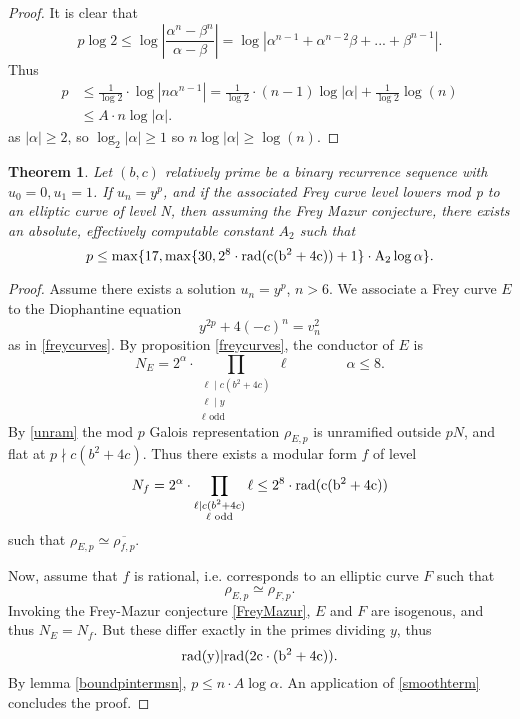 \documentclass[12pt]{amsart}
\newtheorem{thm}{Theorem}[section]
\theoremstyle{definition}
\newcommand{\rad}{\rm rad}
\renewcommand{\bar}{\overline}
\newcommand{\notdiv}{\nmid}
\newcommand{\bfrac}[2]{\left| \frac{#1}{#2} \right|}
\begin{document}
\begin{proof}
It is clear that
\[p\log{2} \leq \log \bfrac{\alpha^n - \beta^n}{\alpha-\beta}  = \log|\alpha^{n-1}+ \alpha^{n-2}\beta+...+\beta^{n-1}|. \]
Thus
\begin{align*}
p & \leq  \frac{1}{\log{2}} \cdot \log|n\alpha^{n-1}| = \frac{1}{\log{2}} \cdot (n-1)\log|\alpha| + \frac{1}{\log{2}} \log(n)  \\
& \leq A\cdot n \log|\alpha|.
\end{align*}
as $|\alpha| \geq 2$, so $\log_2|\alpha| \geq 1$ so $n\log|\alpha| \geq  \log(n)$.
\end{proof}

\begin{thm}\label{ell_bound_final}
Let $(b,c)$ relatively prime be a binary recurrence sequence with $u_0=0,u_1=1$. If $u_n = y^p$, and if the associated Frey curve level lowers mod p to an elliptic curve of level N, then assuming the Frey Mazur conjecture, there exists an absolute, effectively computable constant $A_2$ such that
\[ p \leq \max\{17, \max\{30, 2^8 \cdot \rad(c(b^2+4c))+1\} \cdot A_2\log{\alpha} \}. \]
\end{thm}

\begin{proof}
Assume there exists a solution $u_n = y^p$, $n > 6$.
We associate a Frey curve $E$ to the Diophantine equation
\[ y^{2p} +4(-c)^n = v_n^2 \]
as in \ref{freycurves}.  By proposition \ref{freycurves}, the conductor of $E$ is
\[ N_E = 2^{\alpha}  \cdot \prod_{\substack{ \ell \mid c(b^2+4c) \\ \ell \mid y \\ \ell \text{ odd}}} \ell \qquad \qquad \alpha \leq 8. \]
By \ref{unram} the mod $p$ Galois representation $\rho_{E,p}$ is unramified outside $pN$, and flat at $p \notdiv c(b^2+4c)$.  Thus there exists a modular form $f$ of level 
\[N_f = 2^{\alpha} \cdot \prod_{\substack{ \ell \mid c(b^2+4c) \\ \ell \text{ odd}}} \ell \leq 2^8 \cdot \rad(c(b^2+4c))  \]
such that $\rho_{E,p} \simeq \bar{\rho_{f,p}} $.  

Now, assume that $f$ is rational, i.e. corresponds to an elliptic curve $F$ such that
\[ \rho_{E,p} \simeq \rho_{F,p}. \]  
Invoking the Frey-Mazur conjecture \ref{FreyMazur}, $E$ and $F$ are isogenous, and thus $N_E = N_{f}$.  But these differ exactly in the primes dividing $y$, thus
\[ \rad(y) | \rad(2c \cdot (b^2+4c)). \]
 By lemma \ref{boundpintermsn}, $p \leq n \cdot A\log{\alpha}$. An application of \ref{smoothterm} concludes the proof.
\end{proof}
\end{document}
